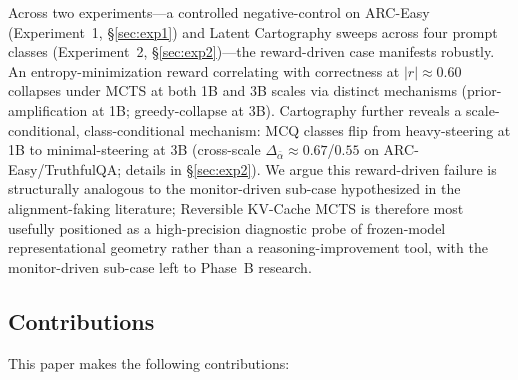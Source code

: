 Across two experiments---a controlled negative-control on ARC-Easy (Experiment~1, §\ref{sec:exp1}) and Latent Cartography sweeps across four prompt classes (Experiment~2, §\ref{sec:exp2})---the reward-driven case manifests robustly. An entropy-minimization reward correlating with correctness at $|r| \approx 0.60$ collapses under MCTS at both 1B and 3B scales via distinct mechanisms (prior-amplification at 1B; greedy-collapse at 3B). Cartography further reveals a scale-conditional, class-conditional mechanism: MCQ classes flip from heavy-steering at 1B to minimal-steering at 3B (cross-scale $\Delta_{\bar\alpha} \approx 0.67$/$0.55$ on ARC-Easy/TruthfulQA; details in §\ref{sec:exp2}). We argue this reward-driven failure is structurally analogous to the monitor-driven sub-case hypothesized in the alignment-faking literature; Reversible KV-Cache MCTS is therefore most usefully positioned as a high-precision diagnostic probe of frozen-model representational geometry rather than a reasoning-improvement tool, with the monitor-driven sub-case left to Phase~B research.

\subsection{Contributions}

This paper makes the following contributions:

